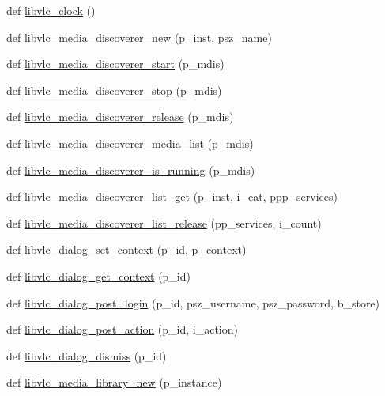 \begin{DoxyCompactItemize}
def \hyperlink{namespacevlc_a87be950b9641fe8db6fdbbbf35a472ab}{libvlc\+\_\+clock} ()
\item 
def \hyperlink{namespacevlc_aca3af54c1b5d61bc7877d189b8fda18b}{libvlc\+\_\+media\+\_\+discoverer\+\_\+new} (p\+\_\+inst, psz\+\_\+name)
\item 
def \hyperlink{namespacevlc_a717cf33da5cb426ea198e5cc7c23fcac}{libvlc\+\_\+media\+\_\+discoverer\+\_\+start} (p\+\_\+mdis)
\item 
def \hyperlink{namespacevlc_a90f5d66c443b544188e64f67dc85e95a}{libvlc\+\_\+media\+\_\+discoverer\+\_\+stop} (p\+\_\+mdis)
\item 
def \hyperlink{namespacevlc_adddb8a8785beb08b0599ccb43c3ddffd}{libvlc\+\_\+media\+\_\+discoverer\+\_\+release} (p\+\_\+mdis)
\item 
def \hyperlink{namespacevlc_a7a67121178840567c764d45a7965d52b}{libvlc\+\_\+media\+\_\+discoverer\+\_\+media\+\_\+list} (p\+\_\+mdis)
\item 
def \hyperlink{namespacevlc_a67f645168455fbbbb9199ff602583113}{libvlc\+\_\+media\+\_\+discoverer\+\_\+is\+\_\+running} (p\+\_\+mdis)
\item 
def \hyperlink{namespacevlc_ad4eb84abb29b0c9c742ce5444bb21d69}{libvlc\+\_\+media\+\_\+discoverer\+\_\+list\+\_\+get} (p\+\_\+inst, i\+\_\+cat, ppp\+\_\+services)
\item 
def \hyperlink{namespacevlc_a0b232d83e1c5d5876f6438665a63532f}{libvlc\+\_\+media\+\_\+discoverer\+\_\+list\+\_\+release} (pp\+\_\+services, i\+\_\+count)
\item 
def \hyperlink{namespacevlc_ae2518de4fc487b909f150484dbf7b457}{libvlc\+\_\+dialog\+\_\+set\+\_\+context} (p\+\_\+id, p\+\_\+context)
\item 
def \hyperlink{namespacevlc_a5ea0badeed0f8c755ec3c2ba8d575120}{libvlc\+\_\+dialog\+\_\+get\+\_\+context} (p\+\_\+id)
\item 
def \hyperlink{namespacevlc_a91274ca62987d6dc96fab02187a0ab11}{libvlc\+\_\+dialog\+\_\+post\+\_\+login} (p\+\_\+id, psz\+\_\+username, psz\+\_\+password, b\+\_\+store)
\item 
def \hyperlink{namespacevlc_ae828437593ff045f13c2befbe418d3f4}{libvlc\+\_\+dialog\+\_\+post\+\_\+action} (p\+\_\+id, i\+\_\+action)
\item 
def \hyperlink{namespacevlc_a27caf08ba5684529165692463fc5d346}{libvlc\+\_\+dialog\+\_\+dismiss} (p\+\_\+id)
\item 
def \hyperlink{namespacevlc_a4f0c42c16464e769b411cbcf38091eeb}{libvlc\+\_\+media\+\_\+library\+\_\+new} (p\+\_\+instance)

\end{DoxyCompactItemize}
